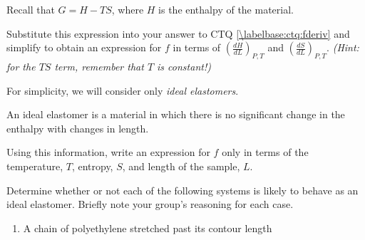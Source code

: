 \begin{activity}
\begin{ctqs}
	\question Recall that $G = H - TS$, where $H$ is the enthalpy of the material.  
	
		Substitute this expression into your answer to CTQ \ref{\labelbase:ctq:fderiv} and simplify to obtain an expression for $f$ in terms of $\left(\frac{dH}{dL}\right)_{P,T}$ and $\left(\frac{dS}{dL}\right)_{P,T}$.  \emph{(Hint: for the $TS$ term, remember that $T$ is constant!)}
		
		\begin{solution}[1.5in]\end{solution}
		
		\label{\labelbase:ctq:fdSdL}
	
\end{ctqs}

\begin{infobox}
	
	For simplicity, we will consider only \emph{ideal elastomers}.
	
	An ideal elastomer is a material in which there is no significant change in the enthalpy with changes in length.
	
\end{infobox}

\begin{ctqs}

	\question Using this information, write an expression for $f$ only in terms of the temperature, $T$, entropy, $S$, and length of the sample, $L$.
		
		\begin{solution}[0.75in]\end{solution}
	
	\question Determine whether or not each of the following systems is likely to behave as an ideal elastomer.  Briefly note your group's reasoning for each case.
	
		\begin{enumerate}
			\item A chain of polyethylene stretched past its contour length
			

\end{enumerate}
\end{ctqs}
\end{activity}
